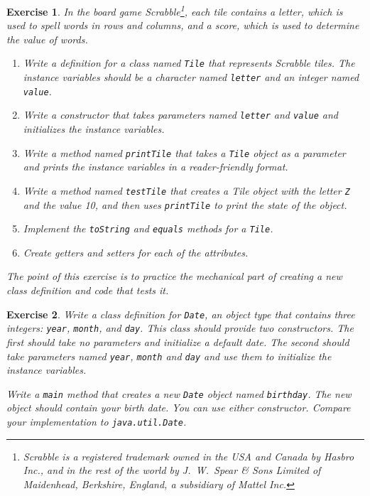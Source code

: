 \documentclass[12pt]{book}
\theoremstyle{exercise}
\newtheorem{exercise}{Exercise}[chapter]
\newcommand{\java}[1]{\verb"#1"}
\newcommand{\java}[1]{\lstinline{#1}} %
\begin{document}
\begin{exercise}
In the board game Scrabble\footnote{Scrabble is a registered trademark owned in the USA and Canada by Hasbro Inc., and in the rest of the world by J.\ W.\ Spear \& Sons Limited of Maidenhead, Berkshire, England, a subsidiary of Mattel Inc.}, each tile contains a letter, which is used to spell words in rows and columns, and a score, which is used to determine the value of words.

\begin{enumerate}

\item Write a definition for a class named \java{Tile} that represents Scrabble tiles.
The instance variables should be a character named \java{letter} and an integer named \java{value}.

\item Write a constructor that takes parameters named \java{letter} and \java{value} and initializes the instance variables.

\item Write a method named \java{printTile} that takes a \java{Tile} object as a parameter and prints the instance variables in a reader-friendly format.

\item Write a method named \java{testTile} that creates a Tile object with the letter \java{Z} and the value 10, and then uses \java{printTile} to print the state of the object.

\item Implement the \java{toString} and \java{equals} methods for a \java{Tile}.

\item Create getters and setters for each of the attributes.

\end{enumerate}

The point of this exercise is to practice the mechanical part of creating a new class definition and code that tests it.
\end{exercise}


\begin{exercise}
Write a class definition for \java{Date}, an object type that contains three integers: \java{year}, \java{month}, and \java{day}.
This class should provide two constructors.
The first should take no parameters and initialize a default date.
The second should take parameters named \java{year}, \java{month} and \java{day} and use them to initialize the instance variables.

Write a \java{main} method that creates a new \java{Date} object named \java{birthday}.
The new object should contain your birth date.
You can use either constructor.
Compare your implementation to \java{java.util.Date}.
\end{exercise}
\end{document}
